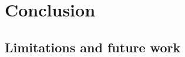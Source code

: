 
\chapter{Conclusion}
\label{chapter:conclusion}

\section{Limitations and future work}
\label{sec:limitations_and_future_work}
